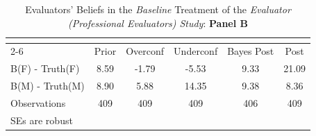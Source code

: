 \begin{table}[htbp]\centering
\caption{Evaluators' Beliefs in the \textit{Baseline} Treatment of the \textit{Evaluator (Professional Evaluators) Study}: \textbf{Panel B}}
\begin{tabular}{l*{5}{c}}
\hline\hline
                &\multicolumn{5}{c}{}                             \\\cmidrule(lr){2-6}
                &\multicolumn{1}{c}{Prior}&\multicolumn{1}{c}{Overconf}&\multicolumn{1}{c}{Underconf}&\multicolumn{1}{c}{Bayes Post}&\multicolumn{1}{c}{Post}\\
\hline
B(F) - Truth(F) &     8.59&    -1.79&    -5.53&     9.33&    21.09\\
B(M) - Truth(M) &     8.90&     5.88&    14.35&     9.38&     8.36\\
\hline
Observations    &      409&      409&      409&      406&      409\\
\hline\hline
\multicolumn{6}{l}{\footnotesize SEs are robust}\\
\end{tabular}
\end{table}
